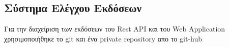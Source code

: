 \subsection{Σύστημα Ελέγχου Εκδόσεων}

Για την διαχείριση των εκδόσεων του Rest API και του Web Application χρησιμοποιήθηκε το git\footnotemark{} και ένα private repository απο το git-hub\footnotemark{} 